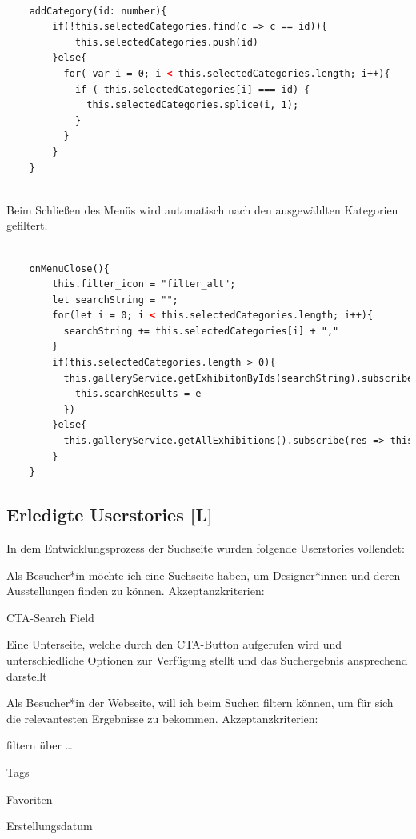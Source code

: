 \begin{lstlisting}[caption={Auswählen und Abwählen der Kategorien},language=HTML]

    addCategory(id: number){
        if(!this.selectedCategories.find(c => c == id)){
            this.selectedCategories.push(id)
        }else{
          for( var i = 0; i < this.selectedCategories.length; i++){
            if ( this.selectedCategories[i] === id) {
              this.selectedCategories.splice(i, 1);
            }
          }
        }
    }
        
\end{lstlisting}

Beim Schließen des Menüs wird automatisch nach den ausgewählten Kategorien gefiltert.


\begin{lstlisting}[caption={Filter von Kategorien anwenden},language=HTML]

    onMenuClose(){
        this.filter_icon = "filter_alt";
        let searchString = "";
        for(let i = 0; i < this.selectedCategories.length; i++){
          searchString += this.selectedCategories[i] + ","
        }
        if(this.selectedCategories.length > 0){
          this.galleryService.getExhibitonByIds(searchString).subscribe(e => {
            this.searchResults = e
          })
        }else{
          this.galleryService.getAllExhibitions().subscribe(res => this.searchResults = res);
        }
    }
\end{lstlisting}



\subsection{Erledigte Userstories [L]}
In dem Entwicklungsprozess der Suchseite wurden folgende Userstories vollendet:
\begin{compactitem}
  \item Als Besucher*in möchte ich eine Suchseite haben, um Designer*innen und deren Ausstellungen finden zu können. Akzeptanzkriterien:
    \begin{compactitem}
        \item CTA-Search Field
        \item Eine Unterseite, welche durch den CTA-Button aufgerufen wird und unterschiedliche Optionen zur Verfügung stellt und das Suchergebnis ansprechend darstellt
    \end{compactitem}
    \item  Als Besucher*in der Webseite, will ich beim Suchen filtern können, um für sich die relevantesten Ergebnisse zu bekommen. Akzeptanzkriterien:
    \begin{compactitem}
        \item filtern über …
        \begin{compactitem}
            \item Tags
            \item Favoriten
            \item Erstellungsdatum
        \end{compactitem}
    \end{compactitem}
\end{compactitem}